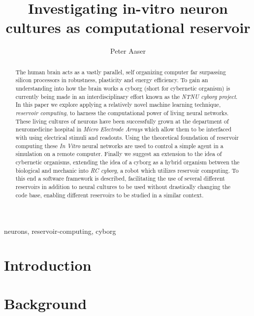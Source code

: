 \documentclass[journal]{IEEEtran}
\begin{document}
\title{Investigating in-vitro neuron cultures as computational reservoir}

\author{Peter Aaser}
%
\maketitle

\begin{abstract}
  The human brain acts as a vastly parallel, self organizing computer far
  surpassing silicon processors in robustness, plasticity and energy
  efficiency.
  To gain an understanding into how the brain works a cyborg (short for
  cybernetic organism) is currently being made in an interdisciplinary effort
  known as the \textit{NTNU cyborg project}.
  In this paper we explore applying a relatively novel machine learning
  technique, \textit{reservoir computing}, to harness the computational power of
  living neural networks.
  These living cultures of neurons have been successfully grown at the
  department of neuromedicine hospital in \textit{Micro Electrode Arrays} which
  allow them to be interfaced with using electrical stimuli and readouts.
  Using the theoretical foundation of reservoir computing these \textit{In
    Vitro} neural networks are used to control a simple agent in a simulation on
  a remote computer.
  Finally we suggest an extension to the idea of cybernetic organisms, extending
  the idea of a cyborg as a hybrid organism between the biological and mechanic
  into \textit{RC cyborg}, a robot which utilizes reservoir computing.
  To this end a software framework is described, facilitating the use of several
  different reservoirs in addition to neural cultures to be used without
  drastically changing the code base, enabling different reservoirs to be
  studied in a similar context.
\end{abstract}

\begin{IEEEkeywords}
neurons, reservoir-computing, cyborg
\end{IEEEkeywords}

\section{Introduction}

\section{Background}

\end{document}
